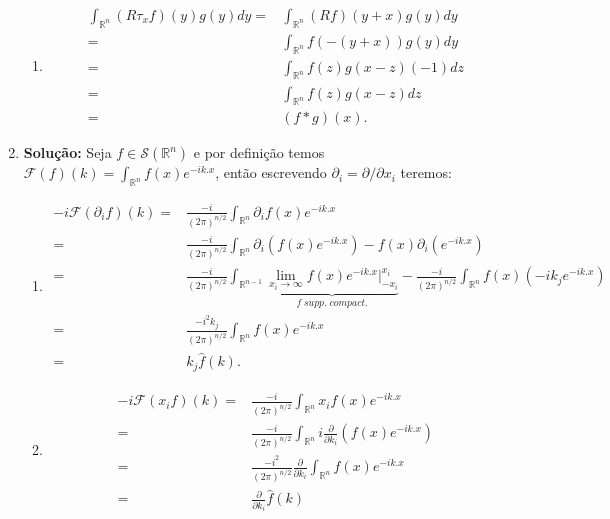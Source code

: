 \documentclass{article}
\begin{document}
\begin{enumerate}
\begin{enumerate}
				\item
				$$
				\begin{aligned}
				\int_{\mathbb{R}^{n}} (R\tau_{x}f)(y)g(y)dy = & \int_{\mathbb{R}^{n}} (Rf)(y+x)g(y)dy
				\\ = & \int_{\mathbb{R}^{n}} f(-(y+x))g(y)dy
				\\ = & \int_{\mathbb{R}^{n}} f(z)g(x-z)(-1)dz
				\\ = & \int_{\mathbb{R}^{n}} f(z)g(x-z)dz
				\\ = & (f*g)(x).
				\end{aligned}
				$$
			\end{enumerate}
		\item \textbf{Solução:} Seja $f \in \mathcal{S}(\mathbb{R}^{n})$ e por definição temos $\mathcal{F}(f)(k) = \int_{\mathbb{R}^{n}} f(x)e^{-ik.x}$, então escrevendo $\partial_{i} = \partial/\partial x_{i}$ teremos:
			\begin{enumerate}
				\item 
				$$
				\begin{aligned}
				-i\mathcal{F}(\partial_{i}f)(k) = & \frac{-i}{(2\pi)^{n/2}}\int_{\mathbb{R}^{n}} \partial_{i}f(x)e^{-ik.x}
				\\
				= & \frac{-i}{(2\pi)^{n/2}}\int_{\mathbb{R}^{n}} \partial_{i}( f(x)e^{-ik.x} ) - f(x)\partial_{i}(e^{-ik.x})
				\\
				= & \frac{-i}{(2\pi)^{n/2}}\int_{\mathbb{R}^{n-1}} \underbrace{ \lim_{x_{i} \to \infty} f(x)e^{-ik.x} \Big|^{x_{i}}_{-x_{i}} }_{f \; supp. \; compact.} - \frac{-i}{(2\pi)^{n/2}}\int_{\mathbb{R}^{n}}  f(x) (-ik_{j}e^{-ik.x})
				\\
				= & \frac{-i^{2}k_{j}}{(2\pi)^{n/2}}\int_{\mathbb{R}^{n}}  f(x) e^{-ik.x}
				\\
				= & k_{j}\hat{f}(k).	
				\end{aligned}
				$$
				
				\item
				$$
				\begin{aligned}
				-i\mathcal{F}(x_{i}f)(k) = & \frac{-i}{(2\pi)^{n/2}}\int_{\mathbb{R}^{n}} x_{i}f(x)e^{-ik.x}
				\\
				= & \frac{-i}{(2\pi)^{n/2}}\int_{\mathbb{R}^{n}} i\frac{\partial}{\partial k_{i}}( f(x)e^{-ik.x} )
				\\
				= & \frac{-i^{2}}{(2\pi)^{n/2}} \frac{\partial}{\partial k_{i}}\int_{\mathbb{R}^{n}} f(x)e^{-ik.x}
				\\
				= & \frac{\partial}{\partial k_{i}}\hat{f}(k)
				\end{aligned}
				$$
			\end{enumerate}
		

\end{enumerate}
\end{document}
